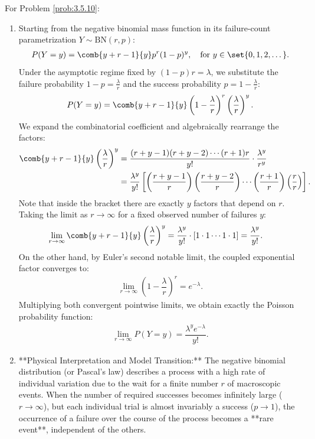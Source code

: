 \begin{solucion}
	\label{sol:3.5.10}
	For Problem \ref{prob:3.5.10}:
	\begin{enumerate}
		\item Starting from the negative binomial mass function in its failure-count parametrization $Y \sim \text{BN}(r, p)$:
		\begin{align*}
			P(Y = y) = \comb{y+r-1}{y} p^r (1-p)^y, \quad \text{for } y \in \set{0, 1, 2, \dots}.
		\end{align*}
		Under the asymptotic regime fixed by $(1-p)r = \lambda$, we substitute the failure probability $1-p = \frac{\lambda}{r}$ and the success probability $p = 1 - \frac{\lambda}{r}$:
		\begin{align*}
			P(Y = y) = \comb{y+r-1}{y} \left(1 - \dfrac{\lambda}{r}\right)^r \left(\dfrac{\lambda}{r}\right)^y.
		\end{align*}
		We expand the combinatorial coefficient and algebraically rearrange the factors:
		\begin{align*}
			\comb{y+r-1}{y} \left(\dfrac{\lambda}{r}\right)^y &= \dfrac{(r+y-1)(r+y-2)\cdots(r+1)r}{y!} \cdot \dfrac{\lambda^y}{r^y} \\
			&= \dfrac{\lambda^y}{y!} \left[ \left(\dfrac{r+y-1}{r}\right)\left(\dfrac{r+y-2}{r}\right)\cdots\left(\dfrac{r+1}{r}\right)\left(\dfrac{r}{r}\right) \right].
		\end{align*}
		Note that inside the bracket there are exactly $y$ factors that depend on $r$. Taking the limit as $r \to \infty$ for a fixed observed number of failures $y$:
		\begin{align*}
			\lim_{r \to \infty} \comb{y+r-1}{y} \left(\dfrac{\lambda}{r}\right)^y &= \dfrac{\lambda^y}{y!} \cdot \left[ 1 \cdot 1 \cdots 1 \cdot 1 \right] = \dfrac{\lambda^y}{y!}.
		\end{align*}
		On the other hand, by Euler's second notable limit, the coupled exponential factor converges to:
		\begin{align*}
			\lim_{r \to \infty} \left(1 - \dfrac{\lambda}{r}\right)^r = e^{-\lambda}.
		\end{align*}
		Multiplying both convergent pointwise limits, we obtain exactly the Poisson probability function:
		\begin{align*}
			\lim_{r \to \infty} P(Y = y) = \dfrac{\lambda^y e^{-\lambda}}{y!}.
		\end{align*}
		\item **Physical Interpretation and Model Transition:**
		The negative binomial distribution (or Pascal's law) describes a process with a high rate of individual variation due to the wait for a finite number $r$ of macroscopic events. When the number of required successes becomes infinitely large ($r \to \infty$), but each individual trial is almost invariably a success ($p \to 1$), the occurrence of a failure over the course of the process becomes a **rare event**, independent of the others.


\end{enumerate}
\end{solucion}
